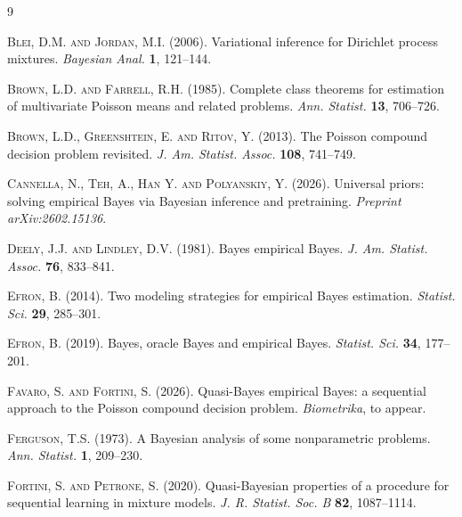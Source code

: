 \documentclass[twoside,12pt]{article}
\begin{document}
{}
\begin{thebibliography}{9}

\textsc{Blei, D.M. and Jordan, M.I.} (2006). Variational inference for Dirichlet process mixtures. \textit{Bayesian Anal.} \textbf{1}, 121--144.

\textsc{Brown, L.D. and Farrell, R.H.} (1985). Complete class theorems for estimation of multivariate Poisson means and related problems. \textit{Ann. Statist.} \textbf{13}, 706--726.

\textsc{Brown, L.D., Greenshtein, E. and Ritov, Y.} (2013). The Poisson compound decision problem revisited. \textit{J. Am. Statist. Assoc.} \textbf{108}, 741--749.

\textsc{Cannella, N., Teh, A., Han Y. and Polyanskiy, Y.} (2026). Universal priors: solving empirical Bayes via Bayesian inference and pretraining. \textit{Preprint arXiv:2602.15136}.

\textsc{Deely, J.J. and Lindley, D.V.} (1981). Bayes empirical Bayes. \textit{J. Am. Statist. Assoc.} \textbf{76}, 833--841.

\textsc{Efron, B.} (2014). Two modeling strategies for empirical Bayes estimation. \textit{Statist. Sci.} \textbf{29}, 285--301.

\textsc{Efron, B.} (2019). Bayes, oracle Bayes and empirical Bayes. \textit{Statist. Sci.} \textbf{34}, 177--201.

\textsc{Favaro, S. and Fortini, S.} (2026). Quasi-Bayes empirical Bayes: a sequential approach to the Poisson compound decision problem. \textit{Biometrika}, to appear.

\textsc{Ferguson, T.S.} (1973). A Bayesian analysis of some nonparametric problems. \textit{Ann. Statist.} \textbf{1}, 209--230.

\textsc{Fortini, S. and Petrone, S.} (2020). Quasi-Bayesian properties of a procedure for sequential learning in mixture models. \textit{J. R. Statist. Soc. B} \textbf{82}, 1087--1114.


\end{thebibliography}
\end{document}
